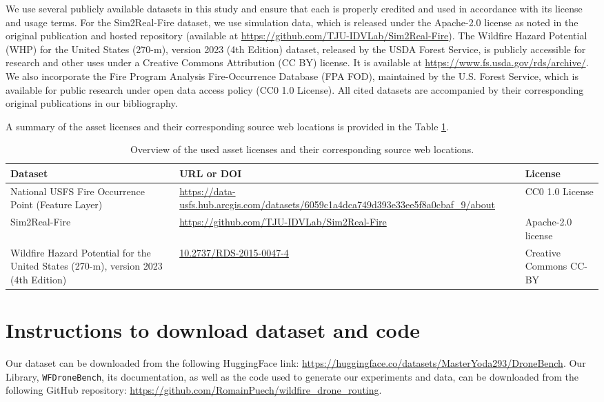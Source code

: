\documentclass{article}
\begin{document}
We use several publicly available datasets in this study and ensure that each is properly credited and used in accordance with its license and usage terms. For the Sim2Real-Fire dataset, we use simulation data, which is released under the Apache-2.0 license as noted in the original publication and hosted repository (available at \url{https://github.com/TJU-IDVLab/Sim2Real-Fire}). The Wildfire Hazard Potential (WHP) for the United States (270-m), version 2023 (4th Edition) dataset, released by the USDA Forest Service, is publicly accessible for research and other uses under a Creative Commons Attribution (CC BY) license. It is available at \url{https://www.fs.usda.gov/rds/archive/}. We also incorporate the Fire Program Analysis Fire-Occurrence Database (FPA FOD), maintained by the U.S. Forest Service, which is available for public research under open data access policy (CC0 1.0 License). All cited datasets are accompanied by their corresponding original publications in our bibliography. 

A summary of the asset licenses and their corresponding source web locations is provided in the Table \ref{tab:assetlicenses}. \newpage

\begin{longtable}{p{4cm}p{6cm}p{3cm}}
\caption{Overview of the used asset licenses and their corresponding source web locations. \label{tab:assetlicenses}} \\
\toprule
\textbf{Dataset} & \textbf{URL or DOI}                               & \textbf{License}   \\
\endfirsthead
%
\endhead
%
\midrule
National USFS Fire Occurrence Point (Feature Layer) &
  \url{https://data-usfs.hub.arcgis.com/datasets/6059c1a4dca749d393e33ee5f8a0cbaf_9/about} &
  CC0 1.0 License \\ \midrule
Sim2Real-Fire    & \url{https://github.com/TJU-IDVLab/Sim2Real-Fire} & Apache-2.0 license \\ \midrule
Wildfire Hazard Potential for the United States (270-m), version 2023 (4th Edition) &
  \url{10.2737/RDS-2015-0047-4} &
  Creative Commons CC-BY
  \\ \bottomrule
\end{longtable}

\section{Instructions to download dataset and code}
Our dataset can be downloaded from the following HuggingFace link: \url{https://huggingface.co/datasets/MasterYoda293/DroneBench}. Our Library, \texttt{WFDroneBench}, its documentation, as well as the code used to generate our experiments and data, can be downloaded from the following GitHub repository: \url{https://github.com/RomainPuech/wildfire_drone_routing}.
\end{document}
